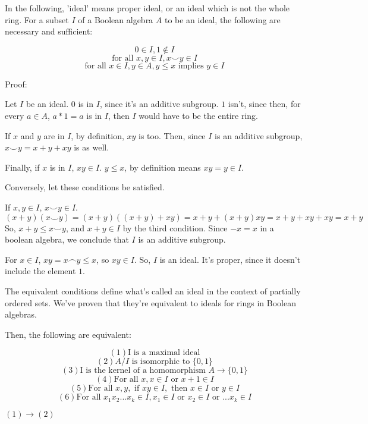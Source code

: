 \documentclass{article}
\begin{document}
      In the following, 'ideal' means proper ideal, or an ideal which is not the
      whole ring. For a subset $I$ of a Boolean algebra $A$ to be an ideal, the
      following are necessary and sufficient:

      \[0 \in I, 1 \notin I\]
      \[\text{for all } x, y \in I, x \smile y \in I\]
      \[\text{for all } x \in I, y \in A, y \leq x \text{ implies } y \in I\]

      Proof:
      
      Let $I$ be an ideal. $0$ is in $I$, since it's an additive subgroup. $1$
      isn't, since then, for every $a \in A$, $a*1 = a$ is in $I$, then $I$
      would have to be the entire ring.

      If $x$ and $y$ are in $I$, by definition, $xy$ is too. Then, since $I$ is
      an additive subgroup, $x \smile y = x + y + xy$ is as well.

      Finally, if $x$ is in $I$, $xy \in I$. $y \leq x$, by definition means
      $xy = y \in I$.

      Conversely, let these conditions be satisfied.

      If $x, y \in I$, $x \smile y \in I$.
      \[(x+y)(x \smile y) = (x+y)((x+y)+xy) = x + y + (x+y)xy = x + y + xy + xy =
      x + y\]
      So, $x+y \leq x \smile y$, and $x+y \in I$ by the third condition. Since
      $-x = x$ in a boolean algebra, we conclude that $I$ is an additive
      subgroup.

      For $x \in I$, $xy = x \frown y \leq x$, so $xy \in I$. So, $I$ is an
      ideal. It's proper, since it doesn't include the element $1$.

      The equivalent conditions define what's called an ideal in the context of
      partially ordered sets. We've proven that they're equivalent to ideals for
      rings in Boolean algebras.

      Then, the following are equivalent:

      \[(1) \text{I is a maximal ideal}\]
      \[(2) A/I \text{ is isomorphic to } \{0,1\}\]
      \[(3) \text{I is the kernel of a homomorphism } A \rightarrow \{0,1\}\]
      \[(4) \text{For all } x, x \in I \text{ or } x+1 \in I\]
      \[(5) \text{For all } x,y, \text{ if } xy \in I, \text{ then } x \in I
      \text{ or } y \in I\]
      \[(6) \text{For all } x_1x_2...x_k \in I, x_1 \in I \text{ or } x_2 \in I
      \text{ or } ... x_k \in I\]

      $(1) \rightarrow (2)$
\end{document}

